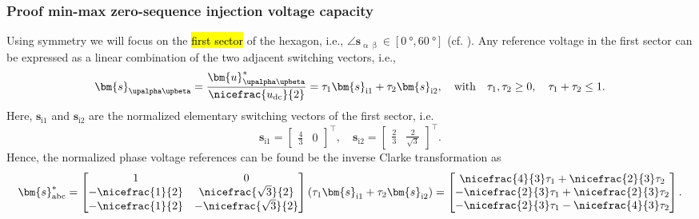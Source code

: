 \begin{frame}
    \frametitle{Proof min-max zero-sequence injection voltage capacity}
    Using symmetry we will focus on the \hl{first sector} of the hexagon, i.e., $\angle  \bm{s}_{\upalpha\upbeta}\in[\SI{0}{\degree}, \SI{60}{\degree}]$   (cf. ). \pause Any reference voltage in the first sector can be expressed as a linear combination of the two adjacent switching vectors, i.e.,
    \begin{equation}
        \bm{s}_{\upalpha\upbeta} = \frac{\bm{u}_{\upalpha\upbeta}^*}{\nicefrac{u_\mathrm{dc}}{2}} = \tau_1 \bm{s}_{\mathrm{i}1} + \tau_2 \bm{s}_{\mathrm{i}2}, \quad \text{with} \quad \tau_1, \tau_2 \geq 0, \quad \tau_1 + \tau_2 \leq 1.
    \end{equation}\pause
    Here, $\bm{s}_{\mathrm{i}1}$ and $\bm{s}_{\mathrm{i}2}$ are the normalized elementary switching vectors of the first sector, i.e.
    \begin{equation}
        \bm{s}_{\mathrm{i}1} = \begin{bmatrix}
            \frac{4}{3} & 0
        \end{bmatrix}^\top, \quad \bm{s}_{\mathrm{i}2} = \begin{bmatrix}
            \frac{2}{3} & \frac{2}{\sqrt{3}}
        \end{bmatrix}^\top.
    \end{equation}\pause
    Hence, the normalized phase voltage references can be found be the inverse Clarke transformation as
    \begin{equation}
        \bm{s}^*_\mathrm{abc} = \begin{bmatrix}
            1                & 0                       \\
            -\nicefrac{1}{2} & \nicefrac{\sqrt{3}}{2}  \\
            -\nicefrac{1}{2} & -\nicefrac{\sqrt{3}}{2}
        \end{bmatrix} \left(\tau_1 \bm{s}_{\mathrm{i}1} + \tau_2 \bm{s}_{\mathrm{i}2}\right) = \begin{bmatrix}
            \nicefrac{4}{3}\tau_1 + \nicefrac{2}{3}\tau_2  \\
            -\nicefrac{2}{3}\tau_1 + \nicefrac{2}{3}\tau_2 \\
            -\nicefrac{2}{3}\tau_1 - \nicefrac{4}{3}\tau_2
        \end{bmatrix}.
        \label{eq:first_sector_hexagon_lin_comb_abc}
    \end{equation}
\end{frame}

